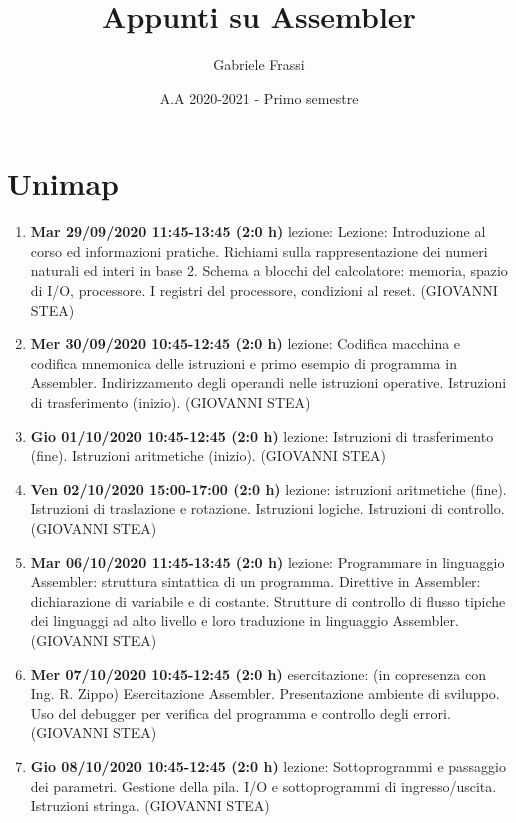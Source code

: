 \documentclass[11pt]{report}
\begin{document}
\title{Appunti su Assembler}
\author{Gabriele Frassi}
\date{A.A 2020-2021 - Primo semestre}
\maketitle

\small\tableofcontents\normalsize

\chapter{Unimap}
\small
\begin{enumerate}
\item \textbf{Mar 29/09/2020 11:45-13:45 (2:0 h)} lezione: Lezione: Introduzione al corso ed informazioni pratiche. Richiami sulla rappresentazione dei numeri naturali ed interi in base 2. Schema a blocchi del calcolatore: memoria, spazio di I/O, processore. I registri del processore, condizioni al reset. (GIOVANNI STEA)
\item \textbf{Mer 30/09/2020 10:45-12:45 (2:0 h)} lezione: Codifica macchina e codifica mnemonica delle istruzioni e primo esempio di programma in Assembler. Indirizzamento degli operandi nelle istruzioni operative. Istruzioni di trasferimento (inizio). (GIOVANNI STEA)
\item \textbf{Gio 01/10/2020 10:45-12:45 (2:0 h)} lezione: Istruzioni di trasferimento (fine). Istruzioni aritmetiche (inizio). (GIOVANNI STEA)
\item \textbf{Ven 02/10/2020 15:00-17:00 (2:0 h)} lezione: istruzioni aritmetiche (fine). Istruzioni di traslazione e rotazione. Istruzioni logiche. Istruzioni di controllo. (GIOVANNI STEA)
\item \textbf{Mar 06/10/2020 11:45-13:45 (2:0 h)} lezione: Programmare in linguaggio Assembler: struttura sintattica di un programma. Direttive in Assembler: dichiarazione di variabile e di costante. Strutture di controllo di flusso tipiche dei linguaggi ad alto livello e loro traduzione in linguaggio Assembler. (GIOVANNI STEA)
\item \textbf{Mer 07/10/2020 10:45-12:45 (2:0 h)} esercitazione: (in copresenza con Ing. R. Zippo) Esercitazione Assembler. Presentazione ambiente di sviluppo. Uso del debugger per verifica del programma e controllo degli errori. (GIOVANNI STEA)
\item \textbf{Gio 08/10/2020 10:45-12:45 (2:0 h)} lezione: Sottoprogrammi e passaggio dei parametri. Gestione della pila. I/O e sottoprogrammi di ingresso/uscita. Istruzioni stringa. (GIOVANNI STEA)

\end{enumerate}
\end{document}
